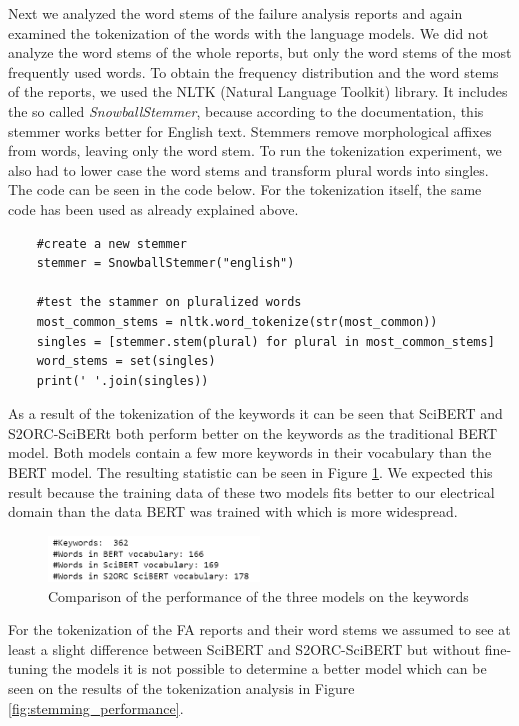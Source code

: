 Next we analyzed the word stems of the failure analysis reports and again examined the tokenization of the words with the language models. We did not analyze the word stems of the whole reports, but only the word stems of the most frequently used words. To obtain the frequency distribution and the word stems of the reports, we used the NLTK (Natural Language Toolkit) library. It includes the so called \textit{SnowballStemmer}, because according to the documentation, this stemmer works better for English text. Stemmers remove morphological affixes from words, leaving only the word stem. To run the tokenization experiment, we also had to lower case the word stems and transform plural words into singles. The code can be seen in the code below. For the tokenization itself, the same code has been used as already explained above.

\begin{verbatim}
	#create a new stemmer
	stemmer = SnowballStemmer("english")
	
	#test the stammer on pluralized words
	most_common_stems = nltk.word_tokenize(str(most_common))
	singles = [stemmer.stem(plural) for plural in most_common_stems]
	word_stems = set(singles)
	print(' '.join(singles))
\end{verbatim}

As a result of the tokenization of the keywords it can be seen that SciBERT and S2ORC-SciBERt both perform better on the keywords as the traditional BERT model. Both models contain a few more keywords in their vocabulary than the BERT model. The resulting statistic can be seen in Figure \ref{fig:comparison}. We expected this result because the training data of these two models fits better to our electrical domain than the data BERT was trained with which is more widespread.


\begin{figure}[H]
	\centering
	\includegraphics[width=0.5\textwidth]{figures/keyword_comparison.PNG}
	\caption{Comparison of the performance of the three models on the keywords}
	\label{fig:comparison}
\end{figure}


For the tokenization of the FA reports and their word stems we assumed to see at least a slight difference between SciBERT and S2ORC-SciBERT but without fine-tuning the models it is not possible to determine a better model which can be seen on the results of the tokenization analysis in Figure \ref{fig:stemming_performance}.



